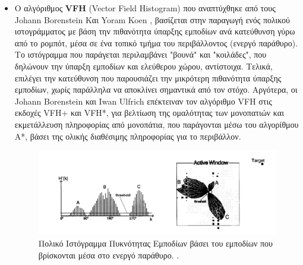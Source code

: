 \begin{itemize}
	
\item 	Ο αλγόριθμος \textbf{VFH} (Vector Field Histogram) που αναπτύχθηκε από τους Johann Borenstein Και Yoram Koen \cite{vfh}, βασίζεται στην παραγωγή ενός πολικού ιστογράμματος με βάση την πιθανότητα ύπαρξης εμποδίων ανά κατεύθυνση γύρω από το ρομπότ, μέσα σε ένα τοπικό τμήμα του περιβάλλοντος (ενεργό παράθυρο). Το ιστόγραμμα που παράγεται περιλαμβάνει "βουνά" και "κοιλάδες", που δηλώνουν την ύπαρξη εμποδίων και ελεύθερου χώρου, αντίστοιχα. Τελικά, επιλέγει την κατεύθυνση που παρουσιάζει την μικρότερη πιθανότητα ύπαρξης εμποδίων, χωρίς παράλληλα να αποκλίνει σημαντικά από τον στόχο. Αργότερα, οι Johann Borenstein και Iwan Ulfrich επέκτειναν τον αλγόριθμο VFH στις εκδοχές VFH+\cite{vfhp} και VFH*\cite{vfhs}, για βελτίωση της ομαλότητας των μονοπατιών και εκμετάλλευση πληροφορίας από μονοπάτια, που παράγονται μέσω του αλγορίθμου A*, βάσει της ολικής διαθέσιμης πληροφορίας για το περιβάλλον.

\begin{figure}[!ht]
	\centering
	\includegraphics[width=0.8\linewidth]{Chapters/Chapter3/Figures/vfh.png}
	\caption[Πολικό Ιστόγραμμα Πυκνότητας Εμποδίων βάσει του εμποδίων που βρίσκονται μέσα στο ενεργό παράθυρο.]{Πολικό Ιστόγραμμα Πυκνότητας Εμποδίων βάσει του εμποδίων που βρίσκονται μέσα στο ενεργό παράθυρο. \cite{vfh}.}
	\label{fig:vfh}
\end{figure}
	

\end{itemize}
